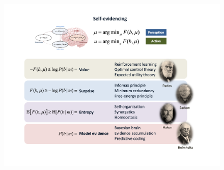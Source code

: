 \documentclass[review,12pt,authoryear]{elsarticle}
\begin{document}
\begin{figure}
    \centering
    \includegraphics[width=\textwidth]{FigureVFEinterpretations.png}
\end{figure}
\end{document}
